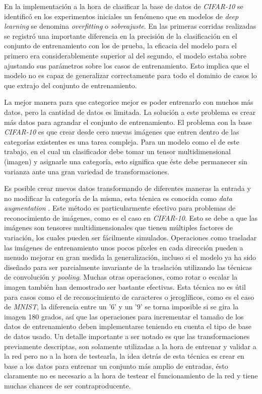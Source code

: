 \documentclass[spanish]{article}
\theoremstyle{definition}
\theoremstyle{remark}
\numberwithin{equation}{section}
\numberwithin{equation}{section} %
\begin{document}
En la implementación a la hora de clasificar la base de datos de \textit{CIFAR-10} \cite{krizhevsky2014cifar} se identificó en los experimentos iniciales un fenómeno que en modelos de \textit{deep learning} se denomina \textit{overfitting} o \textit{sobreajuste}. En las primeras corridas realizadas se registró una importante diferencia en la precisión de la clasificación en el conjunto de  entrenamiento con los de prueba, la eficacia del modelo para el primero era considerablemente superior al del segundo, el modelo estaba sobre ajustando sus parámetros sobre los casos de entrenamiento. Esto implica que el modelo no es capaz de generalizar correctamente para todo el dominio de casos lo que extrajo del conjunto de entrenamiento. 
\par
La mejor manera para que categorice mejor es poder entrenarlo con muchos más datos, pero la cantidad de datos es limitada. La solución a este problema es crear más datos para agrandar el conjunto de entrenamiento. El problema con la base \textit{CIFAR-10} es que crear desde cero nuevas imágenes que entren dentro de las categorías existentes es una tarea compleja. Para un modelo como el de este trabajo, en el cual un clasificador debe tomar un tensor multidimensional (imagen) y asignarle una categoría, esto significa que éste debe permanecer sin varianza ante una gran variedad de transformaciones. 
\par
Es posible crear nuevos datos transformando de diferentes maneras la entrada y no modificar la categoría de la misma, esta técnica es conocida como \textit{data augmentation} \cite{goodfellow2016deep}. Este método es particularmente efectivo para problemas de reconocimiento de imágenes, como es el caso en \textit{CIFAR-10}. Esto se debe a que las imágenes son tensores multidimensionales que tienen múltiples factores de variación, los cuales pueden ser fácilmente simulados. 
Operaciones como trasladar las imágenes de entrenamiento unos pocos píxeles en cada dirección pueden a menudo mejorar en gran medida la generalización, incluso si el modelo ya ha sido diseñado para ser parcialmente invariante de la traslación utilizando las técnicas de convolución y \textit{pooling}. Muchas otras operaciones, como rotar o escalar la imagen también han demostrado ser bastante efectivas. Esta técnica no es útil para casos como el de reconocimiento de caracteres o jeroglíficos, como es el caso de \textit{MNIST}, la diferencia entre un '6' y un '9' se torna imposible si se gira la imagen 180 grados, así que las operaciones para incrementar el tamaño de los datos de entrenamiento deben implementarse teniendo en cuenta el tipo de base de datos usado. Un detalle importante a ser notado es que las transformaciones previamente descriptas, son solamente utilizadas a la hora de entrenar y validar a la red pero no a la hora de testearla, la idea detrás de esta técnica es crear en base a los datos para entrenar un conjunto más amplio de entradas, ésto claramente no es necesario a la hora de testear el funcionamiento de la red y tiene muchas chances de ser contraproducente.     
\par
\end{document}

